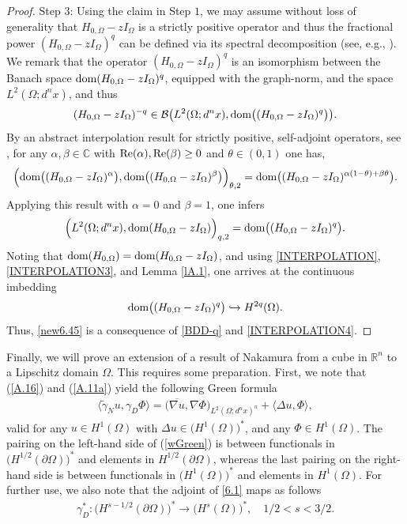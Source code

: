 \documentclass[reqno,10pt, centertags]{amsart}
\newcommand{\bbR}{{\mathbb{R}}}
\newcommand{\bbC}{{\mathbb{C}}}
\newcommand{\cB}{{\mathcal B}}
\newcommand{\lb}{\label}
\newcommand{\ol}{\overline}
\newcommand{\wti}{\widetilde}
\newcommand{\ga}{\gamma}
\newcommand{\Om}{\Omega}
\newcommand{\dOm}{{\partial\Omega}}
\newcommand{\dom}{\text{\rm{dom}}}
\renewcommand{\Re}{\text{\rm Re}}
\numberwithin{equation}{section}
\theoremstyle{definition}
\begin{document}
\begin{proof}
Step $3$: Using the claim in Step $1$, we may assume without loss of
generality that $H_{0,\Om}-zI_{\Omega}$ is a strictly positive operator 
and thus the fractional power $(H_{0,\Om}-zI_{\Omega})^q$ can be defined
via its spectral decomposition (see, e.g., \cite[Sec.1.18.10]{Tr78}). We
remark that the operator
$(H_{0,\Om}-zI_{\Omega})^q$ is an isomorphism between the Banach space
$\dom(H_{0,\Om}-zI_{\Omega})^q$, equipped with the graph-norm, and the
space $L^{2}(\Omega;d^nx)$, and thus
\begin{equation}\label{BDD-q}
(H_{0,\Om}-zI_{\Omega})^{-q}\in
\cB\big(L^2(\Om;d^nx),\dom\big((H_{0,\Om}-zI_{\Omega})^q\big)\big).
\end{equation}
By an abstract interpolation result for strictly positive, self-adjoint
operators, see \cite[Theorem 1.18.10]{Tr78}, for any $\alpha,\beta\in\bbC$
with $\Re(\alpha),\Re(\beta)\ge0$ and $\theta\in(0,1)$ one has,
\begin{equation}\label{INTERPOLATION2}
\Big(\dom\big((H_{0,\Om}-zI_{\Omega})^\alpha\big),\dom\big((H_{0,\Om}
-zI_{\Omega})^\beta\big)
\Big)_{\theta,2}
=\dom\big((H_{0,\Om}-zI_{\Omega})^{\alpha(1-\theta)+\beta\theta}\big).
\end{equation}
Applying this result with $\alpha=0$ and $\beta=1$, one infers
\begin{equation}\label{INTERPOLATION3}
\Big(L^{2}(\Omega;d^nx),\dom(H_{0,\Om}-zI_{\Omega})\Big)_{q,2}
=\dom\big((H_{0,\Om}-zI_{\Omega})^q\big).
\end{equation}
Noting that $\dom(H_{0,\Om})=\dom(H_{0,\Om}-zI_{\Omega})$, and using
\eqref{INTERPOLATION},
\eqref{INTERPOLATION3}, and Lemma \ref{lA.1}, one arrives at the
continuous imbedding
\begin{equation}\label{INTERPOLATION4}
\dom\big((H_{0,\Om}-zI_{\Omega})^q\big) \hookrightarrow H^{2q}(\Omega).
\end{equation}
Thus, \eqref{new6.45} is a consequence of \eqref{BDD-q} and
\eqref{INTERPOLATION4}.
\end{proof}

Finally, we will prove an extension of a result of Nakamura \cite[Lemma
6]{Na01} from a cube in $\bbR^n$ to a Lipschitz domain $\Om$.
This requires some preparation. First, we note that
(\ref{A.16}) and (\ref{A.11a}) yield the following Green formula
\begin{align}
\langle\wti\gamma_N u,\ga_D\Phi\rangle = \big(\ol{\nabla u}, \nabla
\Phi\big)_{L^2(\Om;d^nx)^n} + \langle\Delta u,\Phi\rangle,
\lb{wGreen}
\end{align}
valid for any $u\in H^{1}(\Om)$ with $\Delta u\in\big(H^{1}(\Om)\big)^*$, and
any $\Phi\in H^{1}(\Om)$. The pairing on the left-hand side of (\ref{wGreen})
is between functionals in $\big(H^{1/2}(\dOm)\big)^*$ and elements in
$H^{1/2}(\dOm)$, whereas the last pairing on the right-hand side is
between functionals in $\big(H^{1}(\Om)\big)^*$ and elements in
$H^{1}(\Om)$. For further use, we also note that the adjoint of \eqref{6.1}
maps as follows
\begin{align}
\ga_D^* : \big(H^{s-1/2}(\dOm)\big)^* \to (H^{s}(\Om)\big)^*, \quad
1/2<s<3/2. \lb{ga*}
\end{align}
\end{document}
